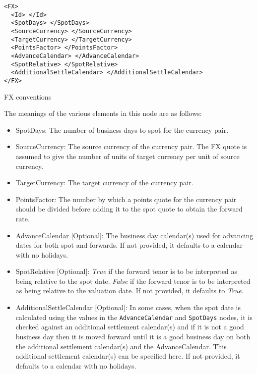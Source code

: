 \begin{listing}[H]
\begin{verbatim}
<FX>
  <Id> </Id>
  <SpotDays> </SpotDays>
  <SourceCurrency> </SourceCurrency>
  <TargetCurrency> </TargetCurrency>
  <PointsFactor> </PointsFactor>
  <AdvanceCalendar> </AdvanceCalendar>
  <SpotRelative> </SpotRelative>
  <AdditionalSettleCalendar> </AdditionalSettleCalendar>
</FX>
\end{verbatim}
\caption{FX conventions}
\label{lst:fx_conventions}
\end{listing}


The meanings of the various elements in this node are as follows:
\begin{itemize}
\item SpotDays: The number of business days to spot for the currency pair.
\item SourceCurrency: The source currency of the currency pair. The FX quote is assumed to give the number of units of
target currency per unit of source currency.
\item TargetCurrency: The target currency of the currency pair.
\item PointsFactor: The number by which a points quote for the currency pair should be divided before adding it to the
spot quote to obtain the forward rate.
\item AdvanceCalendar [Optional]: The business day calendar(s) used for advancing dates for both spot and forwards. If
not provided, it defaults to a calendar with no holidays.
\item SpotRelative [Optional]: \emph{True} if the forward tenor is to be interpreted as being relative to the spot date.
\emph{False} if the forward tenor is to be interpreted as being relative to the valuation date. If not provided, it
defaults to \emph{True}.
\item AdditionalSettleCalendar [Optional]: In some cases, when the spot date is calculated using the values in the
\lstinline!AdvanceCalendar! and \lstinline!SpotDays! nodes, it is checked against an additional settlement calendar(s)
and if it is not a good business day then it is moved forward until it is a good business day on both the additional
settlement calendar(s) and the AdvanceCalendar. This additional settlement calendar(s) can be specified here. If not
provided, it defaults to a calendar with no holidays.
\end{itemize}

